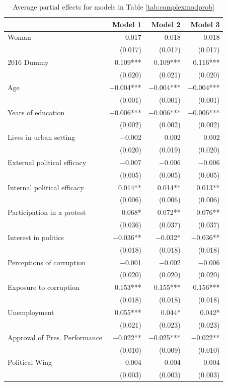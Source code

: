 \documentclass[floatsintext,man]{apa7}\usepackage[]{graphicx}\usepackage[]{color}
\begin{document}
\clearpage
\begin{table}[htbp]
\begin{center}
\label{tab:apecompprob1}
\caption{Average partial effects for models in Table \ref{tab:complexmodprob}}

\begin{tabular}[t]{lrrr}
\toprule
  & Model 1 & Model 2 & Model 3\\
\midrule
Woman & \num{0.017} & \num{0.018} & \num{0.018}\\
 & (\num{0.017}) & (\num{0.017}) & (\num{0.017})\\
2016 Dummy & \num{0.109}*** & \num{0.109}*** & \num{0.116}***\\
 & (\num{0.020}) & (\num{0.021}) & (\num{0.020})\\
Age & \num{-0.004}*** & \num{-0.004}*** & \num{-0.004}***\\
 & (\num{0.001}) & (\num{0.001}) & (\num{0.001})\\
Years of education & \num{-0.006}*** & \num{-0.006}*** & \num{-0.006}***\\
 & (\num{0.002}) & (\num{0.002}) & (\num{0.002})\\
Lives in urban setting & \num{-0.002} & \num{0.002} & \num{0.002}\\
 & (\num{0.020}) & (\num{0.019}) & (\num{0.020})\\
External political efficacy & \num{-0.007} & \num{-0.006} & \num{-0.006}\\
 & (\num{0.005}) & (\num{0.005}) & (\num{0.005})\\
Internal political efficacy & \num{0.014}** & \num{0.014}** & \num{0.013}**\\
 & (\num{0.006}) & (\num{0.006}) & (\num{0.006})\\
Participation in a protest & \num{0.068}* & \num{0.072}** & \num{0.076}**\\
 & (\num{0.036}) & (\num{0.037}) & (\num{0.037})\\
Interest in politics & \num{-0.036}** & \num{-0.032}* & \num{-0.036}**\\
 & (\num{0.018}) & (\num{0.018}) & (\num{0.018})\\
Perceptions of corruption & \num{-0.001} & \num{-0.002} & \num{-0.006}\\
 & (\num{0.020}) & (\num{0.020}) & (\num{0.020})\\
Exposure to corruption & \num{0.153}*** & \num{0.155}*** & \num{0.156}***\\
 & (\num{0.018}) & (\num{0.018}) & (\num{0.018})\\
Unemployment & \num{0.055}*** & \num{0.044}* & \num{0.042}*\\
 & (\num{0.021}) & (\num{0.023}) & (\num{0.023})\\
Approval of Pres. Performance & \num{-0.022}** & \num{-0.025}*** & \num{-0.022}**\\
 & (\num{0.010}) & (\num{0.009}) & (\num{0.010})\\
Political Wing & \num{0.004} & \num{0.004} & \num{0.004}\\
 & (\num{0.003}) & (\num{0.003}) & (\num{0.003})\\
\bottomrule
\end{tabular}



\end{center}
\end{table}
\end{document}
